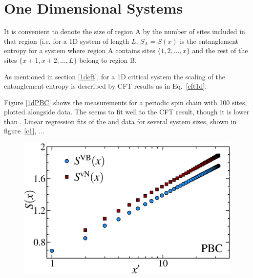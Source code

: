 \section{One Dimensional Systems}


It is convenient to denote the size of region A by the number of sites included in that region 
(i.e. for a 1D system of length $L$, $S_{\text{A}} = S(x)$ is the entanglement entropy for a system where region A contains sites $\{1,2,\dots,x\}$ and the rest of the sites $\{x+1,x+2,\dots,L\}$
belong to region B.

As mentioned in section \ref{1dcft}, for a 1D critical system the scaling of the entanglement entropy is described by CFT results as in Eq.~\eqref{cft1d}. 

Figure \ref{1dPBC} shows the \vb measurements for a periodic spin chain with 100 sites, plotted alongside \vn data.  The \vb seems to fit well to the CFT result, though it is lower than \vn.
Linear regression fits of the \vb and \vn data for several system sizes, shown in figure~\ref{c1}, ...



\begin{figure} {
\includegraphics[width=5.5in]{./figures/paper1/figure1/thesis_pbc.eps} 
\centering
\caption[1D PBC Results for VB EE and von Neumann EE]{
} }
\end{figure}


